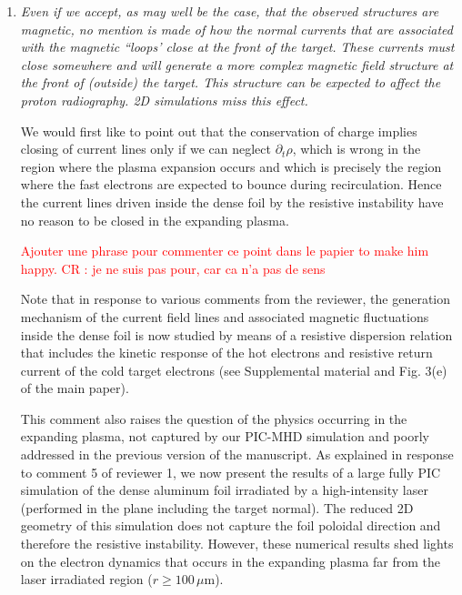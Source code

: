 \documentclass{article}
\begin{document}
\begin{enumerate}
\item \textit{Even if we accept, as may well be the case, that the observed structures are magnetic, no mention is made of how the normal currents that are associated with the magnetic ``loops' close at the front of the target. These currents must close somewhere and will generate a more complex magnetic field structure at the front of (outside) the target. This structure can be expected to affect the proton radiography. 2D simulations miss this effect.}

We would first like to point out that the conservation of charge implies closing of current lines only if we can neglect $\partial_t \rho$, which is  wrong in the region  where the plasma expansion occurs and which is precisely  the region where the fast electrons are expected to bounce during recirculation.
Hence  the current lines  driven inside the dense foil by the resistive instability have no reason to be closed in the expanding plasma.

\textcolor{red}{
Ajouter une phrase pour commenter ce point dans le papier to make him happy.
CR :  je ne suis pas pour, car ca n'a pas de sens
}

Note that in response to various comments from the reviewer,  the generation mechanism of the current field lines and associated magnetic fluctuations inside the dense foil is now studied by means of a resistive dispersion relation that includes the kinetic response of the hot electrons and resistive return current of the cold target electrons (see Supplemental material and Fig. 3(e) of the main paper). 

This comment also raises the question of the physics occurring in the expanding plasma,  not captured by our PIC-MHD simulation and poorly addressed in the previous version of the manuscript.
As explained in response to comment 5 of reviewer 1, 
we now present the results of a large fully PIC simulation of the dense aluminum foil irradiated by a high-intensity laser (performed in the plane including the target normal). 
The reduced 2D geometry of this simulation does not  capture the foil poloidal direction and therefore the resistive instability. 
However, these numerical results shed lights on the electron dynamics that occurs in the expanding plasma far from the laser irradiated region ($r \ge 100 \, \mu$m).


\end{enumerate}
\end{document}
